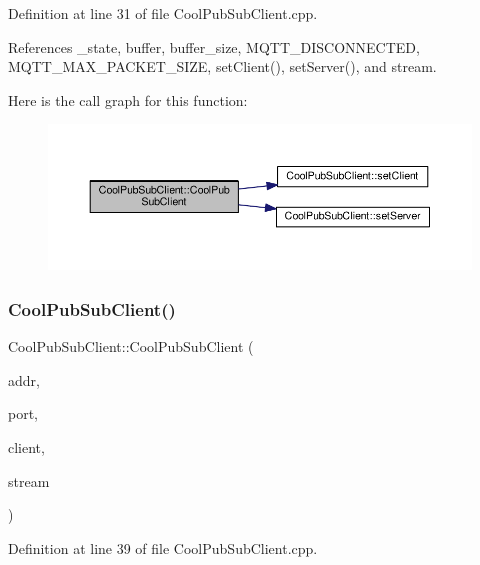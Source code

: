 Definition at line 31 of file Cool\+Pub\+Sub\+Client.\+cpp.



References \+\_\+state, buffer, buffer\+\_\+size, M\+Q\+T\+T\+\_\+\+D\+I\+S\+C\+O\+N\+N\+E\+C\+T\+ED, M\+Q\+T\+T\+\_\+\+M\+A\+X\+\_\+\+P\+A\+C\+K\+E\+T\+\_\+\+S\+I\+ZE, set\+Client(), set\+Server(), and stream.

Here is the call graph for this function\+:\nopagebreak
\begin{figure}[H]
\begin{center}
\leavevmode
\includegraphics[width=350pt]{d8/d4b/class_cool_pub_sub_client_a4548ad6f306f6181e337a86c0b21a89a_cgraph}
\end{center}
\end{figure}
\mbox{\label{class_cool_pub_sub_client_af8b1aeb169366da52e3289bb6c238b6b}} 
\subsubsection{\texorpdfstring{Cool\+Pub\+Sub\+Client()}{CoolPubSubClient()}\hspace{0.1cm}{\footnotesize\ttfamily [4/14]}}
{\footnotesize\ttfamily Cool\+Pub\+Sub\+Client\+::\+Cool\+Pub\+Sub\+Client (\begin{DoxyParamCaption}\item[{I\+P\+Address}]{addr,  }\item[{uint16\+\_\+t}]{port,  }\item[{Client \&}]{client,  }\item[{Stream \&}]{stream }\end{DoxyParamCaption})}



Definition at line 39 of file Cool\+Pub\+Sub\+Client.\+cpp.



